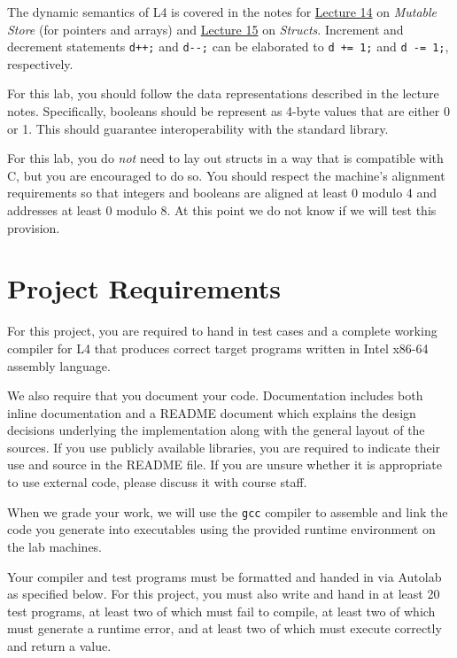 \documentclass[11pt]{article}
\begin{document}
The dynamic semantics of L4 is covered in the notes for
\href{http://www.cs.cmu.edu/~fp/courses/15411-f13/lectures/14-mutable.pdf}{Lecture
  14} on \emph{Mutable Store} (for pointers and arrays) and
\href{http://www.cs.cmu.edu/~fp/courses/15411-f13/lectures/15-structs.pdf}{Lecture
  15} on \emph{Structs}.  Increment and decrement statements
\verb'd++;' and \verb'd--;' can be elaborated to \verb'd += 1;' and
\verb'd -= 1;', respectively.

For this lab, you should follow the data representations described in
the lecture notes.  Specifically, booleans should be represent as
4-byte values that are either 0 or 1.  This should guarantee
interoperability with the standard library.

For this lab, you do \emph{not} need to lay out structs in a way that
is compatible with C, but you are encouraged to do so.  You should
respect the machine's alignment requirements so that integers and
booleans are aligned at least 0 modulo 4 and addresses at least 0
modulo 8.  At this point we do not know if we will test this
provision.


\section{Project Requirements}

For this project, you are required to hand in test cases and a
complete working compiler for L4 that produces correct target
programs written in Intel x86-64 assembly language.

We also require that you document your code. Documentation includes
both inline documentation and a README document which explains the
design decisions underlying the implementation along with the general
layout of the sources. If you use publicly available libraries, you
are required to indicate their use and source in the README file. If
you are unsure whether it is appropriate to use external code, please
discuss it with course staff.

When we grade your work, we will use the \verb"gcc" compiler to
assemble and link the code you generate into executables using the
provided runtime environment on the lab machines.

Your compiler and test programs must be formatted and handed in via
Autolab as specified below. For this project, you must also write and
hand in at least 20 test programs, at least two of which must fail to
compile, at least two of which must generate a runtime error, and at
least two of which must execute correctly and return a value.
\end{document}
